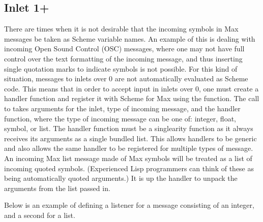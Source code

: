 \documentclass[letterpaper,10pt,english]{sphinxmanual}
\begin{document}
\subsection{Inlet 1+}
\label{\detokenize{features_usage:inlet-1}}
\sphinxAtStartPar
There are times when it is not desirable that the incoming symbols in Max messages be taken as Scheme variable names.
An example of this is dealing with incoming Open Sound Control (OSC) messages, where one may not have full control over
the text formatting of the incoming message,
and thus inserting single quotation marks to indicate symbols is not possible.
For this kind of situation, messages to inlets over 0 are not automatically evaluated as Scheme code.
This means that in order to accept input in inlets over 0, one must create a handler function and register it with
Scheme for Max using the  function.
The call to  takes arguments for the inlet, type of incoming
message, and the handler function, where the type of incoming message can be one of: integer, float, symbol, or list.
The handler function must be a single\sphinxhyphen{}arity function as it always receives its arguments as a single bundled list.
This allows handlers to be generic and also allows the same handler to be registered for multiple types of message.
An incoming Max list message made of Max symbols will be treated as a list of incoming quoted symbols.
(Experienced Lisp programmers can think of these as being automatically quoted arguments.)
It is up the handler to unpack the arguments from the list passed in.

\sphinxAtStartPar
Below is an example of defining a listener for a message consisting of an integer, and
a second for a list.
\end{document}

